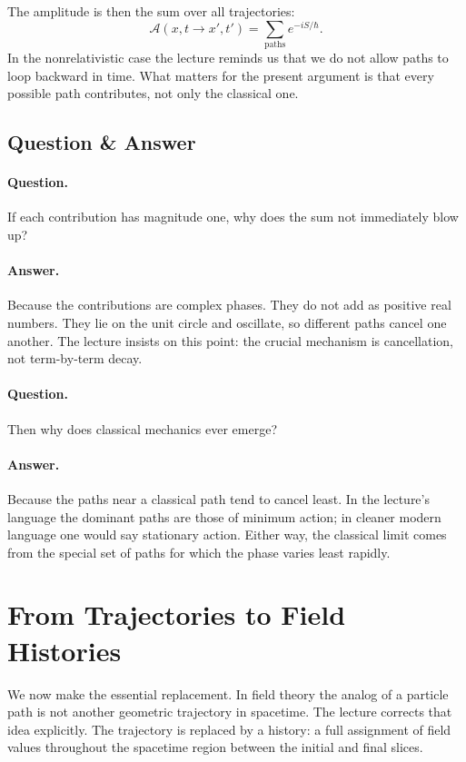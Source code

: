 The amplitude is then the sum over all trajectories:
\begin{equation}
\mathcal{A}(x,t\to x',t')=\sum_{\text{paths}} e^{-iS/\hbar}.
\end{equation}
In the nonrelativistic case the lecture reminds us that we do not allow paths to loop backward in time. What matters for the present argument is that every possible path contributes, not only the classical one.

\subsection{Question \& Answer}

\paragraph{Question.} If each contribution has magnitude one, why does the sum not immediately blow up?

\paragraph{Answer.} Because the contributions are complex phases. They do not add as positive real numbers. They lie on the unit circle and oscillate, so different paths cancel one another. The lecture insists on this point: the crucial mechanism is cancellation, not term-by-term decay.

\paragraph{Question.} Then why does classical mechanics ever emerge?

\paragraph{Answer.} Because the paths near a classical path tend to cancel least. In the lecture's language the dominant paths are those of minimum action; in cleaner modern language one would say stationary action. Either way, the classical limit comes from the special set of paths for which the phase varies least rapidly.

\section{From Trajectories to Field Histories}

We now make the essential replacement. In field theory the analog of a particle path is not another geometric trajectory in spacetime. The lecture corrects that idea explicitly. The trajectory is replaced by a history: a full assignment of field values throughout the spacetime region between the initial and final slices.

